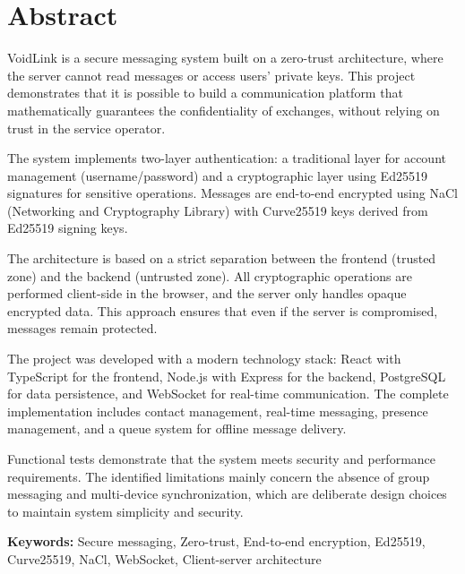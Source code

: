 \chapter*{Abstract}

VoidLink is a secure messaging system built on a zero-trust architecture, where the server cannot read messages or access users' private keys. This project demonstrates that it is possible to build a communication platform that mathematically guarantees the confidentiality of exchanges, without relying on trust in the service operator.

The system implements two-layer authentication: a traditional layer for account management (username/password) and a cryptographic layer using Ed25519 signatures for sensitive operations. Messages are end-to-end encrypted using NaCl (Networking and Cryptography Library) with Curve25519 keys derived from Ed25519 signing keys.

The architecture is based on a strict separation between the frontend (trusted zone) and the backend (untrusted zone). All cryptographic operations are performed client-side in the browser, and the server only handles opaque encrypted data. This approach ensures that even if the server is compromised, messages remain protected.

The project was developed with a modern technology stack: React with TypeScript for the frontend, Node.js with Express for the backend, PostgreSQL for data persistence, and WebSocket for real-time communication. The complete implementation includes contact management, real-time messaging, presence management, and a queue system for offline message delivery.

Functional tests demonstrate that the system meets security and performance requirements. The identified limitations mainly concern the absence of group messaging and multi-device synchronization, which are deliberate design choices to maintain system simplicity and security.

\textbf{Keywords:} Secure messaging, Zero-trust, End-to-end encryption, Ed25519, Curve25519, NaCl, WebSocket, Client-server architecture

